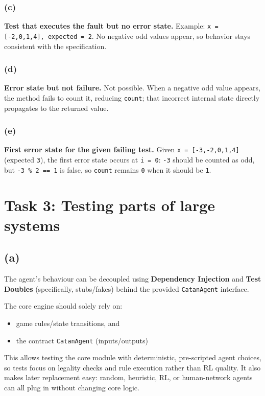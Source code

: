 \subsubsection{(c)}
\textbf{Test that executes the fault but no error state.}
Example: \texttt{x = [-2,0,1,4], expected = 2}. No negative odd values appear, so behavior stays consistent with the specification.

\subsubsection{(d)}
\textbf{Error state but not failure.}
Not possible. When a negative odd value appears, the method fails to count it, reducing \texttt{count}; that incorrect internal state directly propagates to the returned value.

\subsubsection{(e)}
\textbf{First error state for the given failing test.}
Given \texttt{x = [-3,-2,0,1,4]} (expected \texttt{3}), the first error state occurs at \texttt{i = 0}: \texttt{-3} should be counted as odd, but \texttt{-3 \% 2 == 1} is false, so \texttt{count} remains \texttt{0} when it should be \texttt{1}.

\section{Task 3: Testing parts of large systems}

\subsection{(a)}
The agent's behaviour can be decoupled using \textbf{Dependency Injection} and \textbf{Test Doubles} (specifically, stubs/fakes) behind the provided \texttt{CatanAgent} interface.

The core engine should solely rely on:
\begin{itemize}
    \item game rules/state transitions, and
    \item the contract \texttt{CatanAgent} (inputs/outputs)
\end{itemize}

This allows testing the core module with deterministic, pre-scripted agent choices, so tests focus on legality checks and rule execution rather than RL quality. It also makes later replacement easy: random, heuristic, RL, or human-network agents can all plug in without changing core logic.


